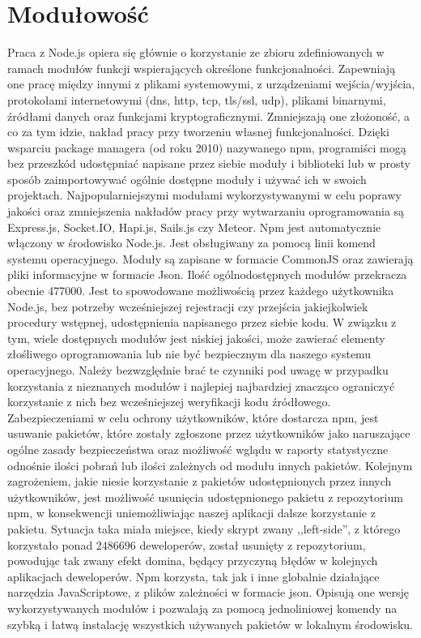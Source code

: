 \documentclass[12pt]{report}
\begin{document}
\section{Modułowość}
Praca z Node.js opiera się głównie o korzystanie ze zbioru zdefiniowanych w ramach modułów funkcji wspierających określone funkcjonalności. 
Zapewniają one pracę między innymi z plikami systemowymi, z urządzeniami wejścia/wyjścia, protokołami internetowymi (dns, http, tcp, tls/ssl, udp), plikami binarnymi, źródłami danych oraz funkcjami kryptograficznymi. 
Zmniejszają one złożoność, a co za tym idzie, nakład pracy przy tworzeniu własnej funkcjonalności. 
Dzięki wsparciu package managera (od roku 2010) nazywanego npm, programiści mogą bez przeszkód udostępniać napisane przez siebie moduły i biblioteki lub w prosty sposób zaimportowywać ogólnie dostępne moduły i używać ich w swoich projektach. 
Najpopularniejszymi modułami wykorzystywanymi w celu poprawy jakości oraz zmniejszenia nakładów pracy przy wytwarzaniu oprogramowania są Express.js, Socket.IO, Hapi.js, Sails.js czy Meteor. 
Npm jest automatycznie włączony w środowisko Node.js. 
Jest obsługiwany za pomocą linii komend systemu operacyjnego. 
Moduły są zapisane w formacie CommonJS oraz zawierają pliki informacyjne w formacie Json. 
Ilość ogólnodostępnych modułów przekracza obecnie 477000. 
Jest to spowodowane możliwością przez każdego użytkownika Node.js, bez potrzeby wcześniejszej rejestracji czy przejścia jakiejkolwiek procedury wstępnej, udostępnienia napisanego przez siebie kodu. 
W związku z tym, wiele dostępnych modułów jest niskiej jakości, może zawierać elementy złośliwego oprogramowania lub nie być bezpiecznym dla naszego systemu operacyjnego. 
Należy bezwzględnie brać te czynniki pod uwagę w przypadku korzystania z nieznanych modułów i najlepiej najbardziej znacząco ograniczyć korzystanie z nich bez wcześniejszej weryfikacji kodu źródłowego. 
Zabezpieczeniami w celu ochrony użytkowników, które dostarcza npm, jest usuwanie pakietów, które zostały zgłoszone przez użytkowników jako naruszające ogólne zasady bezpieczeństwa oraz możliwość wglądu w raporty statystyczne odnośnie ilości pobrań lub ilości zależnych od modułu innych pakietów. 
Kolejnym zagrożeniem, jakie niesie korzystanie z pakietów udostępnionych przez innych użytkowników, jest możliwość usunięcia udostępnionego pakietu z repozytorium npm, w konsekwencji uniemożliwiając naszej aplikacji dalsze korzystanie z pakietu. 
Sytuacja taka miała miejsce, kiedy skrypt zwany ,,left-side'', z którego korzystało ponad 2486696 deweloperów, został usunięty z repozytorium, powodując tak zwany efekt domina, będący przyczyną błędów w kolejnych aplikacjach deweloperów. 
Npm korzysta, tak jak i inne globalnie działające narzędzia JavaScriptowe, z plików zależności w formacie json. 
Opisują one wersję wykorzystywanych modułów i pozwalają za pomocą jednoliniowej komendy na szybką i łatwą instalację wszystkich używanych pakietów w lokalnym środowisku. 
\end{document}
